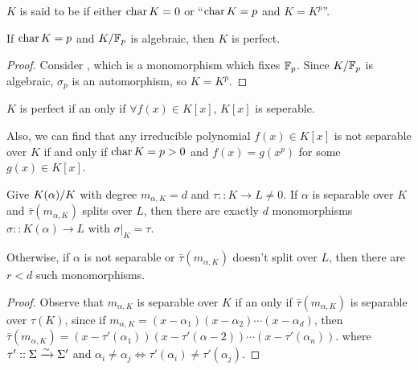 \begin{definition}
  $K$ is said to be \emph{} if either $\operatorname{char} K = 0$ or ``$\operatorname{char} K = p$ and $K = K^p$''.
\end{definition}

\begin{example}
  If $\operatorname{char} K = p$ and ${K}/{\mathbb{F}_p}$ is algebraic, then $K$ is perfect.

  \begin{proof}
    Consider , which is a monomorphism which fixes $\mathbb{F}_p$.
    Since ${K}/{\mathbb{F}_p}$ is algebraic, $\sigma_p$ is an automorphism, so $K = K^p$.
  \end{proof}
\end{example}

\begin{fact}
  $K$ is perfect if an only if $\forall f(x) \in K[x]$, $K[x]$ is seperable.

  Also, we can find that any irreducible polynomial $f(x) \in K[x]$ is not separable over $K$
  if and only if $\operatorname{char} K = p > 0$ and $f(x) = g(x^p)$ for some $g(x) \in K[x]$.
\end{fact}

\begin{prop}
  Give ${K(\alpha)}/{K}$ with degree $m_{\alpha, K} = d$ and $\tau :: K \to L \neq 0$.
  If $\alpha$ is separable over $K$ and $\bar\tau(m_{\alpha, K})$ splits over $L$, then
  there are exactly $d$ monomorphisms $\sigma :: K(\alpha) \to L$ with $\sigma\big|_K = \tau$.
  
  Otherwise, if $\alpha$ is not separable or $\bar\tau(m_{\alpha, K})$ doesn't split over $L$,
  then there are $r < d$ such monomorphisms.

  \begin{proof}
    Observe that $m_{\alpha, K}$ is separable over $K$ if an only if $\bar\tau(m_{\alpha, K})$ is separable over $\tau(K)$,
    since if $m_{\alpha, K} = (x - \alpha_1) (x - \alpha_2) \cdots (x - \alpha_d)$, then
    $\bar\tau(m_{\alpha, K}) = (x - \tau'(\alpha_1)) (x - \tau'(\alpha-2)) \cdots (x - \tau'(\alpha_n))$.
    where $\tau' :: \Sigma \xrightarrow{\sim} \Sigma'$ and $\alpha_i \neq \alpha_j \iff \tau'(\alpha_i) \neq \tau'(\alpha_j)$.
  \end{proof}
\end{prop}

